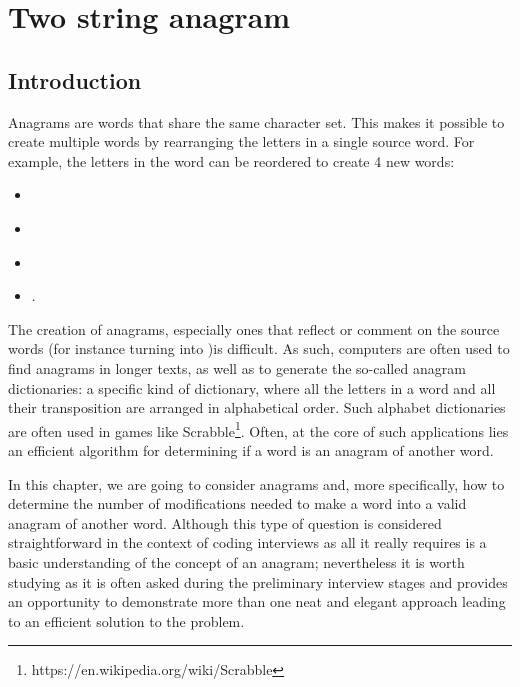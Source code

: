%


\chapter{Two string anagram}
\label{ch:two_string_anagram}
\section*{Introduction}
Anagrams are words that share the same character set. This makes it possible to create multiple words by rearranging the letters in a single source word. For example, the letters in the word \textit{} can be reordered to create 4 new words:
\begin{itemize}
	\item  \textit{}
	\item  \textit{}
	\item  \textit{}
	\item  \textit{}.
\end{itemize}
 
The creation of anagrams, especially ones that reflect or comment on the source words (for instance turning
\textit{} into \textit{})is difficult. As such, 
computers are often used to find anagrams in longer texts, as well as to generate the so-called anagram dictionaries: a specific kind of dictionary, where all the letters in a word and
all their transposition are arranged in alphabetical order. Such alphabet dictionaries  are often used in games like
Scrabble\footnote{https://en.wikipedia.org/wiki/Scrabble}. Often, at the core of such applications lies an efficient algorithm for determining if a word is an anagram of another word.

In this chapter, we are going to consider anagrams and, more specifically, how to determine the number of
modifications needed to make a word into a valid anagram of another word.
Although this type of question is considered straightforward in the context of coding interviews as all it really requires is a basic understanding of the concept of an anagram; nevertheless it is worth studying as it is often asked during the preliminary interview stages and provides an opportunity to demonstrate more than one neat and elegant approach leading to an efficient solution to the problem.

